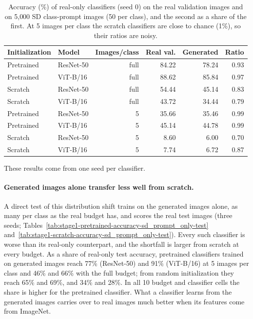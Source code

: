 \begin{table}[H]
\centering
\small
\caption{Accuracy (\%) of real-only classifiers (seed 0) on the real validation images and on 5{,}000 SD
class-prompt images (50 per class), and the second as a share of the first. At 5 images per class the
scratch classifiers are close to chance (1\%), so their ratios are noisy.}
\label{tab:synthetic-accuracy}
\begin{tabular}{llrrrr}
\toprule
Initialization & Model & Images/class & Real val. & Generated & Ratio \\
\midrule
Pretrained & ResNet-50 & full & 84.22 & 78.24 & 0.93 \\
Pretrained & ViT-B/16  & full & 88.62 & 85.84 & 0.97 \\
Scratch    & ResNet-50 & full & 54.44 & 45.14 & 0.83 \\
Scratch    & ViT-B/16  & full & 43.72 & 34.44 & 0.79 \\
\midrule
Pretrained & ResNet-50 & 5 & 35.66 & 35.46 & 0.99 \\
Pretrained & ViT-B/16  & 5 & 45.14 & 44.78 & 0.99 \\
Scratch    & ResNet-50 & 5 & 8.60  & 6.00  & 0.70 \\
Scratch    & ViT-B/16  & 5 & 7.74  & 6.72  & 0.87 \\
\bottomrule
\end{tabular}
\end{table}

These results come from one seed per classifier.

\paragraph{Generated images alone transfer less well from scratch.}
A direct test of this distribution shift trains on the generated images alone, as many per class as the real
budget has, and scores the real test images (three seeds; Tables~\ref{tab:stage1-pretrained-accuracy-sd_prompt_only-test}
and~\ref{tab:stage1-scratch-accuracy-sd_prompt_only-test}). Every such classifier is worse than its real-only counterpart, and
the shortfall is larger from scratch at every budget. As a share of real-only test accuracy, pretrained
classifiers trained on generated images reach 77\% (ResNet-50) and 91\% (ViT-B/16) at 5 images per class and
46\% and 66\% with the full budget; from random initialization they reach 65\% and 69\%, and 34\% and 28\%.
In all 10 budget and classifier cells the share is higher for the pretrained classifier. What a classifier
learns from the generated images carries over to real images much better when its features come from
ImageNet.

